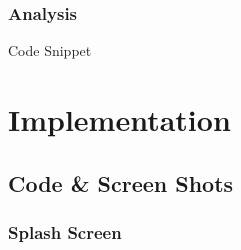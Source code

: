 \documentclass[12pt]{report}
\begin{document}
\subsection{Analysis}
Code Snippet




\chapter{Implementation}


\section{\ignorespacesSource Code & Screen Shots}

\subsection{Splash Screen}
\end{document}
